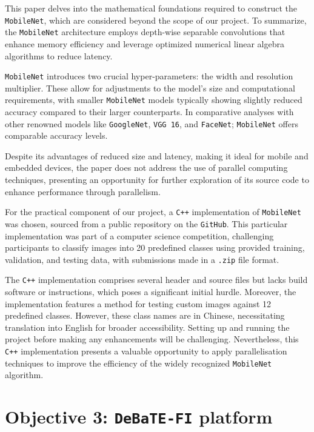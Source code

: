 This paper\cite{mobilenet_paper} delves into the mathematical foundations required to construct the \texttt{MobileNet}, which are considered beyond the scope of our project. To summarize, the \texttt{MobileNet} architecture employs depth-wise separable convolutions that enhance memory efficiency and leverage optimized numerical linear algebra algorithms to reduce latency.

\texttt{MobileNet} introduces two crucial hyper-parameters: the width and resolution multiplier. These allow for adjustments to the model's size and computational requirements, with smaller \texttt{MobileNet} models typically showing slightly reduced accuracy compared to their larger counterparts. In comparative analyses with other renowned models like \texttt{GoogleNet}, \texttt{VGG 16}, and \texttt{FaceNet}; \texttt{MobileNet} offers comparable accuracy levels.

Despite its advantages of reduced size and latency, making it ideal for mobile and embedded devices, the paper\cite{mobilenet_paper} does not address the use of parallel computing techniques, presenting an opportunity for further exploration of its source code to enhance performance through parallelism.

For the practical component of our project, a \texttt{C++} implementation of \texttt{MobileNet} was chosen, sourced from a public repository on the \texttt{GitHub}\cite{mobilenet_repo}. This particular implementation was part of a computer science competition\cite{mobilenet_competition}, challenging participants to classify images into 20 predefined classes using provided training, validation, and testing data, with submissions made in a \texttt{.zip} file format.

The \texttt{C++} implementation comprises several header and source files but lacks build software or instructions, which poses a significant initial hurdle. Moreover, the implementation features a method for testing custom images against 12 predefined classes. However, these class names are in Chinese, necessitating translation into English for broader accessibility. Setting up and running the project before making any enhancements will be challenging. Nevertheless, this \texttt{C++} implementation presents a valuable opportunity to apply parallelisation techniques to improve the efficiency of the widely recognized \texttt{MobileNet} algorithm.

\section{Objective 3: \texttt{DeBaTE-FI} platform}

